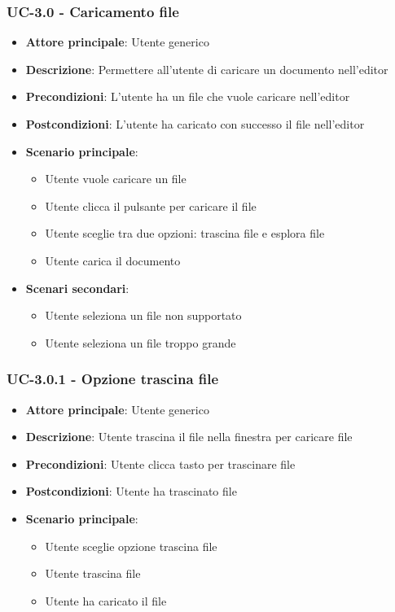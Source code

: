 \documentclass[11pt,a4paper]{article}
\begin{document}
\subsubsection{UC-3.0 - Caricamento file}
\begin{itemize}
    \item \textbf{Attore principale}: Utente generico
    \item \textbf{Descrizione}: Permettere all'utente di caricare un documento nell'editor
    \item \textbf{Precondizioni}: L'utente ha un file che vuole caricare nell'editor
    \item \textbf{Postcondizioni}: L'utente ha caricato con successo il file nell'editor
    \item \textbf{Scenario principale}:
        \begin{itemize}
            \item Utente vuole caricare un file
            \item Utente clicca il pulsante per caricare il file
            \item Utente sceglie tra due opzioni: trascina file e esplora file
            \item Utente carica il documento
        \end{itemize}
    \item \textbf{Scenari secondari}:
        \begin{itemize}
            \item Utente seleziona un file non supportato
            \item Utente seleziona un file troppo grande
        \end{itemize}
\end{itemize}

\subsubsection{UC-3.0.1 - Opzione trascina file}
\begin{itemize}
    \item \textbf{Attore principale}: Utente generico
    \item \textbf{Descrizione}: Utente trascina il file nella finestra per caricare file
    \item \textbf{Precondizioni}: Utente clicca tasto per trascinare file
    \item \textbf{Postcondizioni}: Utente ha trascinato file
    \item \textbf{Scenario principale}:
        \begin{itemize}
            \item Utente sceglie opzione trascina file
            \item Utente trascina file
            \item Utente ha caricato il file
        \end{itemize}
\end{itemize}
\end{document}
